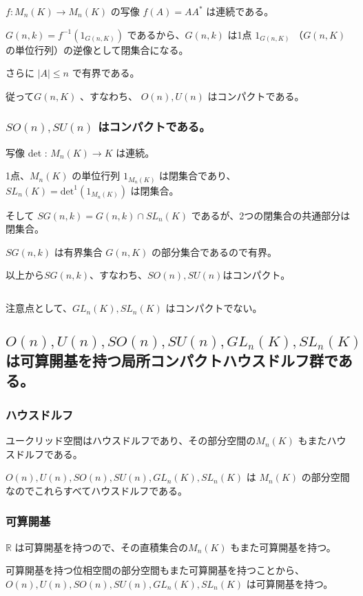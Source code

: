 \documentclass[uplatex,a4j,12pt,dvipdfmx]{jsarticle}
\begin{document}
$f: M_{n}(K) \to M_{n}(K)$ の写像 $f(A) = A A^{*}$ は連続である。

$G(n,k) = f^{-1}(1_{G(n,K)})$ であるから、$G(n,k)$ は1点 $1_{G(n,K)}$ （$G(n,K)$の単位行列）の逆像として閉集合になる。

さらに $|A| \leq n$ で有界である。

従って$G(n,K)$ 、すなわち、 $O(n),U(n)$ はコンパクトである。


\subsubsection{$SO(n),SU(n)$ はコンパクトである。}

写像 det : $M_{n}(K) \to K$ は連続。

1点、$M_{n}(K)$ の単位行列 $1_{M_{n}(K)}$ は閉集合であり、
$SL_{n}(K) = \text{det}^{1}(1_{M_{n}(K)})$ は閉集合。

そして $SG(n,k) = G(n,k) \cap SL_{n}(K)$ であるが、2つの閉集合の共通部分は閉集合。

$SG(n,k)$ は有界集合 $G(n,K)$ の部分集合であるので有界。

以上から$SG(n,k)$、すなわち、$SO(n),SU(n)$はコンパクト。

${}$

注意点として、$GL_{n}(K), SL_{n}(K)$ はコンパクトでない。


\subsection{$O(n),U(n),SO(n),SU(n),GL_{n}(K),SL_{n}(K)$ は可算開基を持つ局所コンパクトハウスドルフ群である。}

\subsubsection{ハウスドルフ}

ユークリッド空間はハウスドルフであり、その部分空間の$M_{n}(K)$ もまたハウスドルフである。

$O(n),U(n),SO(n),SU(n),GL_{n}(K),SL_{n}(K)$ は $M_{n}(K)$ の部分空間なのでこれらすべてハウスドルフである。

\subsubsection{可算開基}

$\mathbb{R}$ は可算開基を持つので、その直積集合の$M_{n}(K)$ もまた可算開基を持つ。

可算開基を持つ位相空間の部分空間もまた可算開基を持つことから、
$O(n),U(n),SO(n),SU(n),GL_{n}(K),SL_{n}(K)$ は可算開基を持つ。
\end{document}
